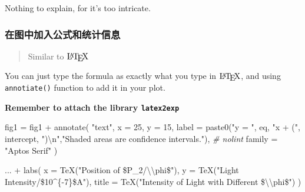 \documentclass[
]{article}
\newenvironment{Shaded}{}{}
\newcommand{\AttributeTok}[1]{\textcolor[rgb]{0.49,0.56,0.16}{#1}}
\newcommand{\CommentTok}[1]{\textcolor[rgb]{0.38,0.63,0.69}{\textit{#1}}}
\newcommand{\DecValTok}[1]{\textcolor[rgb]{0.25,0.63,0.44}{#1}}
\newcommand{\FunctionTok}[1]{\textcolor[rgb]{0.02,0.16,0.49}{#1}}
\newcommand{\NormalTok}[1]{#1}
\newcommand{\OtherTok}[1]{\textcolor[rgb]{0.00,0.44,0.13}{#1}}
\newcommand{\SpecialCharTok}[1]{\textcolor[rgb]{0.25,0.44,0.63}{#1}}
\newcommand{\StringTok}[1]{\textcolor[rgb]{0.25,0.44,0.63}{#1}}
\begin{document}
Nothing to explain, for it's too intricate.

\hypertarget{ux5728ux56feux4e2dux52a0ux5165ux516cux5f0fux548cux7edfux8ba1ux4fe1ux606f}{%
\subsubsection{在图中加入公式和统计信息}\label{ux5728ux56feux4e2dux52a0ux5165ux516cux5f0fux548cux7edfux8ba1ux4fe1ux606f}}

\begin{quote}
Similar to \($\LaTeX$\)
\end{quote}

You can just type the formula as exactly what you type in \($\LaTeX$\),
and using \texttt{annotiate()} function to add it in your plot.

\textbf{Remember to attach the library \texttt{latex2exp}}

\begin{Shaded}
\begin{Highlighting}[]
\NormalTok{fig1 }\OtherTok{=}
\NormalTok{  fig1 }\SpecialCharTok{+}
  \FunctionTok{annotate}\NormalTok{(}
    \StringTok{"text"}\NormalTok{,}
    \AttributeTok{x =} \DecValTok{25}\NormalTok{,}
    \AttributeTok{y =} \DecValTok{15}\NormalTok{,}
    \AttributeTok{label =} \FunctionTok{paste0}\NormalTok{(}\StringTok{"y = "}\NormalTok{, eq, }\StringTok{"x + ("}\NormalTok{, intercept, }\StringTok{")}\SpecialCharTok{\textbackslash{}n}\StringTok{"}\NormalTok{,}\StringTok{"Shaded areas are confidence intervals."}\NormalTok{), }\CommentTok{\# nolint}
    \AttributeTok{family =} \StringTok{"Aptos Serif"}
\NormalTok{  )}
\end{Highlighting}
\end{Shaded}

\begin{Shaded}
\begin{Highlighting}[]
\NormalTok{... }\SpecialCharTok{+}
\FunctionTok{labs}\NormalTok{(}
    \AttributeTok{x =} \FunctionTok{TeX}\NormalTok{(}\StringTok{"Position of \$P\_2/}\SpecialCharTok{\textbackslash{}\textbackslash{}}\StringTok{phi\$"}\NormalTok{),}
    \AttributeTok{y =} \FunctionTok{TeX}\NormalTok{(}\StringTok{"Light Intensity/\$10\^{}\{{-}7\}\$A"}\NormalTok{),}
    \AttributeTok{title =} \FunctionTok{TeX}\NormalTok{(}\StringTok{"Intensity of Light with Different \$}\SpecialCharTok{\textbackslash{}\textbackslash{}}\StringTok{phi\$"}\NormalTok{)}
\NormalTok{  )}
\end{Highlighting}
\end{Shaded}
\end{document}
